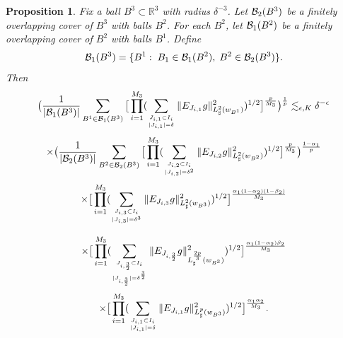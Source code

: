 \documentclass[amssymb,amsfonts,12pt]{amsart}
\newtheorem{proposition}[theorem]{Proposition}
\def\R{{\mathbb R}}
\begin{document}
\begin{proposition}
\label{np3}
Fix a ball $B^3\subset \R^3$ with radius $\delta^{-3}$. Let ${\mathcal B}_2(B^3)$ be a finitely overlapping cover of $B^3$ with balls $B^2$. For each $B^2$, let ${\mathcal B}_1(B^2)$ be a finitely overlapping cover of $B^2$ with balls $B^1$. Define
$${\mathcal B}_1(B^3)=\{B^1:\;B_1\in{\mathcal B}_1(B^2),\;B^2\in{\mathcal B}_2(B^3)\}.$$
Then
$$\big(\frac1{|{\mathcal B}_1(B^3)|}\sum_{B^1\in{\mathcal B}_1(B^3)}\big[\prod_{i=1}^{M_3}(\sum_{J_{i,1}\subset I_i\atop{|J_{i,1}|=\delta}}\|E_{J_{i,1}}g\|_{L^{2}_{\sharp}(w_{B^1})}^2)^{1/2}\big]^{\frac{p}{M_3}
}\big)^{\frac1p}\lesssim_{\epsilon,K} \delta^{-\epsilon}$$
$$\times\big(\frac1{|{\mathcal B}_2(B^3)|}\sum_{B^2\in{\mathcal B}_2(B^3)}\big[\prod_{i=1}^{M_3}(\sum_{J_{i,2}\subset I_i\atop{|J_{i,2}|=\delta^2}}\|E_{J_{i,2}}g\|_{L^{2}_{\sharp}(w_{B^2})}^2)^{1/2}\big]^{\frac{p}{M_3}
}\big)^{\frac{1-\alpha_1}p}$$
$$\times \big[\prod_{i=1}^{M_3}(\sum_{J_{i,3}\subset I_i\atop{|J_{i,3}|=\delta^3}}\|E_{J_{i,3}}g\|_{L^{2}_{\sharp}(w_{B^3})}^2)^{1/2}\big]^{\frac{\alpha_1(1-\alpha_2)(1-\beta_2)}{M_3}}$$

$$\times \big[\prod_{i=1}^{M_3}(\sum_{J_{i,\frac32}\subset I_i\atop{|J_{i,\frac32}|=\delta^{\frac32}}}\|E_{J_{i,{\frac32}}}g\|_{L^{\frac{2p}3}_{\sharp}(w_{B^3})}^2)^{1/2}\big]^{\frac{\alpha_1(1-\alpha_2)\beta_2}{M_3}
}$$
$$\times \big[\prod_{i=1}^{M_3}(\sum_{J_{i,1}\subset I_i\atop{|J_{i,1}|=\delta}}\|E_{J_{i,1}}g\|_{L^p_{\sharp}(w_{B^3})}^2)^{1/2}\big]^{\frac{\alpha_1\alpha_2}{M_3}
}.$$
\end{proposition}
\end{document}
